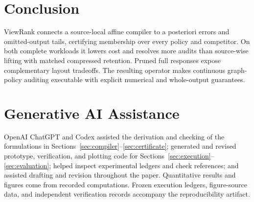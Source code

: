 \documentclass[conference]{IEEEtran}
\begin{document}
\section{Conclusion}
ViewRank connects a source-local affine compiler to a posteriori errors and omitted-output tails, certifying membership over every policy and competitor. On both complete workloads it lowers cost and resolves more audits than source-wise lifting with matched compressed retention. Pruned full responses expose complementary layout tradeoffs. The resulting operator makes continuous graph-policy auditing executable with explicit numerical and whole-output guarantees.

\section*{Generative AI Assistance}
OpenAI ChatGPT and Codex assisted the derivation and checking of the formulations in Sections~\ref{sec:compiler}--\ref{sec:certificate}; generated and revised prototype, verification, and plotting code for Sections~\ref{sec:execution}--\ref{sec:evaluation}; helped inspect experimental ledgers and check references; and assisted drafting and revision throughout the paper. Quantitative results and figures come from recorded computations. Frozen execution ledgers, figure-source data, and independent verification records accompany the reproducibility artifact.
\end{document}
